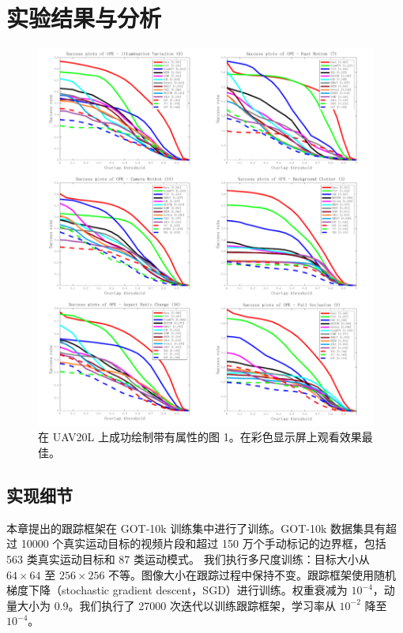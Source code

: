 \section{实验结果与分析}
\label{sec:experiments}

\nopagebreak[3]
\begin{figure}[t!]
\centering
\includegraphics[width=1.0\textwidth]{Img/globally/UAV20L_1.pdf}
\caption{在 UAV20L 上成功绘制带有属性的图 1。在彩色显示屏上观看效果最佳。}
\end{figure}
\nopagebreak[3]

\subsection{实现细节}
本章提出的跟踪框架在 GOT-10k \cite{GOT-10k} 训练集中进行了训练。GOT-10k 数据集具有超过 10000 个真实运动目标的视频片段和超过 150 万个手动标记的边界框，包括 563 类真实运动目标和 87 类运动模式。
我们执行多尺度训练：目标大小从 $64 \times 64$ 至 $256 \times 256$ 不等。图像大小在跟踪过程中保持不变。跟踪框架使用随机梯度下降（stochastic gradient descent，SGD）进行训练。权重衰减为 $10^{-4}$，动量大小为 0.9。我们执行了 27000 次迭代以训练跟踪框架，学习率从 $10^{-2}$ 降至 $10^{-4}$。

